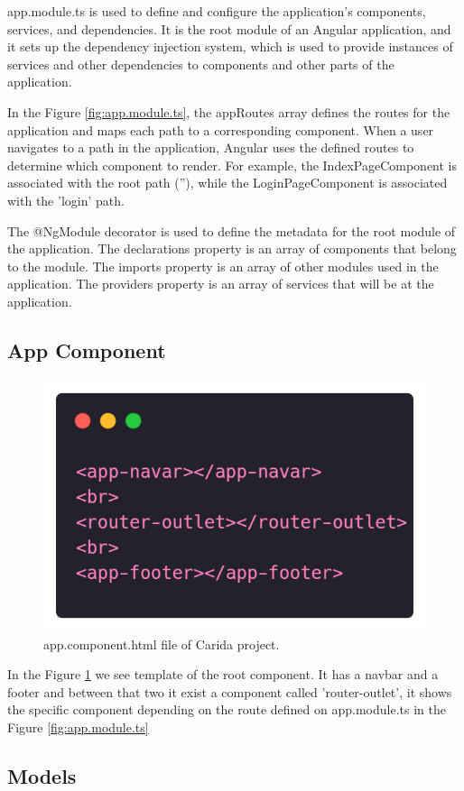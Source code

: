 \documentclass{article}
\begin{document}
  app.module.ts is used to define and configure the application's components, services, and dependencies. It is the root module of an Angular application, and it sets up the dependency injection system, which is used to provide instances of services and other dependencies to components and other parts of the application.

  In the Figure \ref{fig:app.module.ts}, the appRoutes array defines the routes for the application and maps each path to a corresponding component. When a user navigates to a path in the application, Angular uses the defined routes to determine which component to render. For example, the IndexPageComponent is associated with the root path (''), while the LoginPageComponent is associated with the 'login' path. 
  
  The @NgModule decorator is used to define the metadata for the root module of the application. The declarations property is an array of components that belong to the module. The imports property is an array of other modules used in the application. The providers property is an array of services that will be at the application.

  \subsection*{App Component}
    \begin{figure}[h]
      \centering
      \includegraphics[width=0.5\columnwidth]{figures/app.component.html.png}
      \caption{app.component.html file of Carida project.\label{fig:app.component.html.png}}
      \end{figure}

      In the Figure \ref{fig:app.component.html.png} we see template of the root component. It has a navbar and a footer and between that two it exist a component called 'router-outlet', it shows the specific component depending on the route defined on app.module.ts in the Figure \ref{fig:app.module.ts}

  \subsection*{Models}
\end{document}
